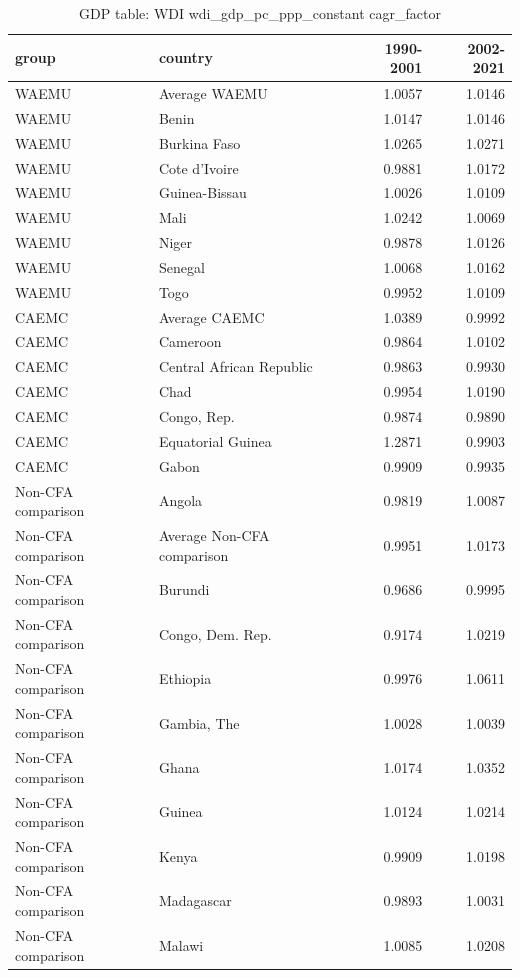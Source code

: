 \begin{table}

\caption{GDP table: WDI wdi_gdp_pc_ppp_constant cagr_factor}
\centering
\begin{tabular}[t]{llrr}
\toprule
group & country & 1990-2001 & 2002-2021\\
\midrule
WAEMU & Average WAEMU & 1.0057 & 1.0146\\
WAEMU & Benin & 1.0147 & 1.0146\\
WAEMU & Burkina Faso & 1.0265 & 1.0271\\
WAEMU & Cote d'Ivoire & 0.9881 & 1.0172\\
WAEMU & Guinea-Bissau & 1.0026 & 1.0109\\
\addlinespace
WAEMU & Mali & 1.0242 & 1.0069\\
WAEMU & Niger & 0.9878 & 1.0126\\
WAEMU & Senegal & 1.0068 & 1.0162\\
WAEMU & Togo & 0.9952 & 1.0109\\
CAEMC & Average CAEMC & 1.0389 & 0.9992\\
\addlinespace
CAEMC & Cameroon & 0.9864 & 1.0102\\
CAEMC & Central African Republic & 0.9863 & 0.9930\\
CAEMC & Chad & 0.9954 & 1.0190\\
CAEMC & Congo, Rep. & 0.9874 & 0.9890\\
CAEMC & Equatorial Guinea & 1.2871 & 0.9903\\
\addlinespace
CAEMC & Gabon & 0.9909 & 0.9935\\
Non-CFA comparison & Angola & 0.9819 & 1.0087\\
Non-CFA comparison & Average Non-CFA comparison & 0.9951 & 1.0173\\
Non-CFA comparison & Burundi & 0.9686 & 0.9995\\
Non-CFA comparison & Congo, Dem. Rep. & 0.9174 & 1.0219\\
\addlinespace
Non-CFA comparison & Ethiopia & 0.9976 & 1.0611\\
Non-CFA comparison & Gambia, The & 1.0028 & 1.0039\\
Non-CFA comparison & Ghana & 1.0174 & 1.0352\\
Non-CFA comparison & Guinea & 1.0124 & 1.0214\\
Non-CFA comparison & Kenya & 0.9909 & 1.0198\\
\addlinespace
Non-CFA comparison & Madagascar & 0.9893 & 1.0031\\
Non-CFA comparison & Malawi & 1.0085 & 1.0208\\

\end{tabular}
\end{table}

